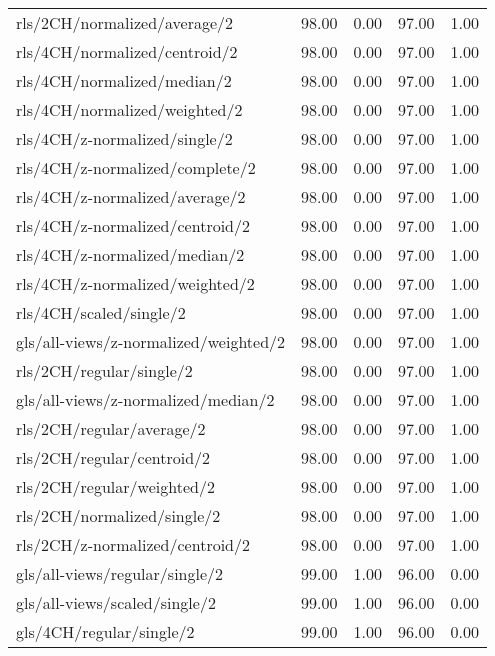 \begin{longtable}{lrrrr}
    rls/2CH/normalized/average/2              & 98.00 &  0.00 & 97.00 &  1.00 \\
    rls/4CH/normalized/centroid/2             & 98.00 &  0.00 & 97.00 &  1.00 \\
    rls/4CH/normalized/median/2               & 98.00 &  0.00 & 97.00 &  1.00 \\
    rls/4CH/normalized/weighted/2             & 98.00 &  0.00 & 97.00 &  1.00 \\
    rls/4CH/z-normalized/single/2             & 98.00 &  0.00 & 97.00 &  1.00 \\
    rls/4CH/z-normalized/complete/2           & 98.00 &  0.00 & 97.00 &  1.00 \\
    rls/4CH/z-normalized/average/2            & 98.00 &  0.00 & 97.00 &  1.00 \\
    rls/4CH/z-normalized/centroid/2           & 98.00 &  0.00 & 97.00 &  1.00 \\
    rls/4CH/z-normalized/median/2             & 98.00 &  0.00 & 97.00 &  1.00 \\
    rls/4CH/z-normalized/weighted/2           & 98.00 &  0.00 & 97.00 &  1.00 \\
    rls/4CH/scaled/single/2                   & 98.00 &  0.00 & 97.00 &  1.00 \\
    gls/all-views/z-normalized/weighted/2     & 98.00 &  0.00 & 97.00 &  1.00 \\
    rls/2CH/regular/single/2                  & 98.00 &  0.00 & 97.00 &  1.00 \\
    gls/all-views/z-normalized/median/2       & 98.00 &  0.00 & 97.00 &  1.00 \\
    rls/2CH/regular/average/2                 & 98.00 &  0.00 & 97.00 &  1.00 \\
    rls/2CH/regular/centroid/2                & 98.00 &  0.00 & 97.00 &  1.00 \\
    rls/2CH/regular/weighted/2                & 98.00 &  0.00 & 97.00 &  1.00 \\
    rls/2CH/normalized/single/2               & 98.00 &  0.00 & 97.00 &  1.00 \\
    rls/2CH/z-normalized/centroid/2           & 98.00 &  0.00 & 97.00 &  1.00 \\
    gls/all-views/regular/single/2            & 99.00 &  1.00 & 96.00 &  0.00 \\
    gls/all-views/scaled/single/2             & 99.00 &  1.00 & 96.00 &  0.00 \\
    gls/4CH/regular/single/2                  & 99.00 &  1.00 & 96.00 &  0.00 \\

\end{longtable}
